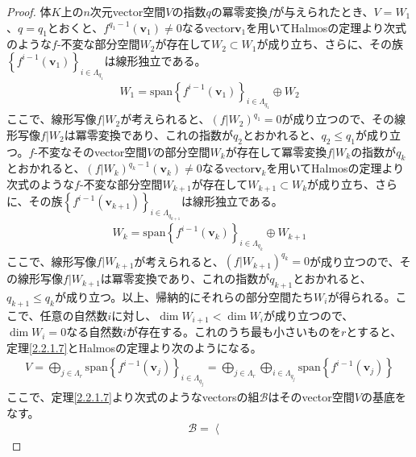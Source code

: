 \documentclass[dvipdfmx]{jsarticle}
\begin{document}
\begin{proof}
体$K$上の$n$次元vector空間$V$の指数$q$の冪零変換$f$が与えられたとき、$V = W_{1}$、$q = q_{1}$とおくと、$f^{q_{1} - 1}\left( \mathbf{v}_{1} \right) \neq 0$なるvector$\mathbf{v}_{1}$を用いてHalmosの定理より次式のような$f$-不変な部分空間$W_{2}$が存在して$W_{2} \subset W_{1}$が成り立ち、さらに、その族$\left\{ f^{i - 1}\left( \mathbf{v}_{1} \right)\right\}_{i \in \varLambda_{q_{1}} } $は線形独立である。
\begin{align*}
W_{1} = {\mathrm{span}}\left\{ f^{i - 1}\left( \mathbf{v}_{1} \right) \right\}_{i \in \varLambda_{q_{1}}} \oplus W_{2}
\end{align*}
ここで、線形写像$f|W_{2}$が考えられると、$\left( f|W_{2} \right)^{q_{1}} = 0$が成り立つので、その線形写像$f|W_{2}$は冪零変換であり、これの指数が$q_{2}$とおかれると、$q_{2} \leq q_{1}$が成り立つ。$f$-不変なそのvector空間$V$の部分空間$W_{k}$が存在して冪零変換$f|W_{k}$の指数が$q_{k}$とおかれると、$\left( f|W_{k} \right)^{q_{k} - 1}\left( \mathbf{v}_{k} \right) \neq 0$なるvector$\mathbf{v}_{k}$を用いてHalmosの定理より次式のような$f$-不変な部分空間$W_{k + 1}$が存在して$W_{k + 1} \subset W_{k}$が成り立ち、さらに、その族$\left\{ f^{i - 1}\left( \mathbf{v}_{k + 1} \right)\right\}_{i \in \varLambda_{q_{k + 1}}}$は線形独立である。
\begin{align*}
W_{k} = {\mathrm{span}}\left\{ f^{i - 1}\left( \mathbf{v}_{k} \right) \right\}_{i \in \varLambda_{q_{k}}} \oplus W_{k + 1}
\end{align*}
ここで、線形写像$f|W_{k + 1}$が考えられると、$\left( f|W_{k + 1} \right)^{q_{k}} = 0$が成り立つので、その線形写像$f|W_{k + 1}$は冪零変換であり、これの指数が$q_{k + 1}$とおかれると、$q_{k + 1} \leq q_{k}$が成り立つ。以上、帰納的にそれらの部分空間たち$W_{i}$が得られる。ここで、任意の自然数$i$に対し、$\dim W_{i + 1} < \dim W_{i}$が成り立つので、$\dim W_{i} = 0$なる自然数$i$が存在する。これのうち最も小さいものを$r$とすると、定理\ref{2.2.1.7}とHalmosの定理より次のようになる。
\begin{align*}
V = \bigoplus_{j \in \varLambda_{r}} {{\mathrm{span}}\left\{ f^{i - 1}\left( \mathbf{v}_{j} \right) \right\}_{i \in \varLambda_{q_{j}}}} = \bigoplus_{j \in \varLambda_{r}} {\bigoplus_{i \in \varLambda_{q_{j}}} {{\mathrm{span}}\left\{ f^{i - 1}\left( \mathbf{v}_{j} \right) \right\}}}
\end{align*}
ここで、定理\ref{2.2.1.7}より次式のようなvectorsの組$\mathcal{B}$はそのvector空間$V$の基底をなす。
\begin{align*}
\mathcal{B} =\left\langle \begin{matrix}

\end{matrix}
\end{align*}
\end{proof}
\end{document}
